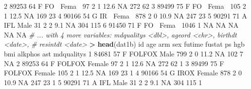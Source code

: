 \documentclass[
]{book}
\newenvironment{Shaded}{\begin{snugshade}}{\end{snugshade}}
\newcommand{\CommentTok}[1]{\textcolor[rgb]{0.56,0.35,0.01}{\textit{#1}}}
\newcommand{\DecValTok}[1]{\textcolor[rgb]{0.00,0.00,0.81}{#1}}
\newcommand{\FloatTok}[1]{\textcolor[rgb]{0.00,0.00,0.81}{#1}}
\newcommand{\KeywordTok}[1]{\textcolor[rgb]{0.13,0.29,0.53}{\textbf{#1}}}
\newcommand{\NormalTok}[1]{#1}
\newcommand{\OperatorTok}[1]{\textcolor[rgb]{0.81,0.36,0.00}{\textbf{#1}}}
\newcommand{\OtherTok}[1]{\textcolor[rgb]{0.56,0.35,0.01}{#1}}
\newcommand{\StringTok}[1]{\textcolor[rgb]{0.31,0.60,0.02}{#1}}
\begin{document}
\begin{Shaded}
\begin{Highlighting}[]
\DecValTok{2} \DecValTok{89253}    \DecValTok{64}\NormalTok{ F FO}\OperatorTok{~}\StringTok{ }\NormalTok{Fema}\OperatorTok{~}\StringTok{     }\DecValTok{97}      \DecValTok{2}     \DecValTok{1}  \FloatTok{12.6}    \OtherTok{NA}     \DecValTok{272}    \DecValTok{62}
\DecValTok{3} \DecValTok{89499}    \DecValTok{75}\NormalTok{ F FO}\OperatorTok{~}\StringTok{ }\NormalTok{Fema}\OperatorTok{~}\StringTok{    }\DecValTok{105}      \DecValTok{2}     \DecValTok{1}  \FloatTok{12.5}    \OtherTok{NA}     \DecValTok{169}    \DecValTok{23}
\DecValTok{4} \DecValTok{90166}    \DecValTok{54}\NormalTok{ G IR}\OperatorTok{~}\StringTok{ }\NormalTok{Fema}\OperatorTok{~}\StringTok{    }\DecValTok{878}      \DecValTok{2}     \DecValTok{0}  \FloatTok{10.9}    \OtherTok{NA}     \DecValTok{247}    \DecValTok{23}
\DecValTok{5} \DecValTok{90291}    \DecValTok{71}\NormalTok{ A IFL Male      }\DecValTok{31}      \DecValTok{2}     \DecValTok{2}   \FloatTok{9.1}    \OtherTok{NA}     \DecValTok{304}   \DecValTok{115}
\DecValTok{6} \DecValTok{91450}    \DecValTok{71}\NormalTok{ F FO}\OperatorTok{~}\StringTok{ }\NormalTok{Fema}\OperatorTok{~}\StringTok{   }\DecValTok{1046}      \DecValTok{1}    \OtherTok{NA}  \OtherTok{NA}      \OtherTok{NA}      \OtherTok{NA}    \OtherTok{NA}
\CommentTok{# ... with 4 more variables: mdqualitys <dbl>, ageord <chr>, birthdt <date>,}
\CommentTok{#   resintdt <date>}
\OperatorTok{>}\StringTok{ }\KeywordTok{head}\NormalTok{(dat1b)}
\NormalTok{     id age      arm    sex futime fustat ps  hgb bmi alkphos ast mdqualitys}
\DecValTok{1} \DecValTok{84681}  \DecValTok{57}\NormalTok{ F FOLFOX   Male    }\DecValTok{799}      \DecValTok{2}  \DecValTok{0} \FloatTok{11.2}  \OtherTok{NA}     \DecValTok{102}   \DecValTok{7}         \OtherTok{NA}
\DecValTok{2} \DecValTok{89253}  \DecValTok{64}\NormalTok{ F FOLFOX Female     }\DecValTok{97}      \DecValTok{2}  \DecValTok{1} \FloatTok{12.6}  \OtherTok{NA}     \DecValTok{272}  \DecValTok{62}          \DecValTok{1}
\DecValTok{3} \DecValTok{89499}  \DecValTok{75}\NormalTok{ F FOLFOX Female    }\DecValTok{105}      \DecValTok{2}  \DecValTok{1} \FloatTok{12.5}  \OtherTok{NA}     \DecValTok{169}  \DecValTok{23}          \DecValTok{1}
\DecValTok{4} \DecValTok{90166}  \DecValTok{54}\NormalTok{   G IROX Female    }\DecValTok{878}      \DecValTok{2}  \DecValTok{0} \FloatTok{10.9}  \OtherTok{NA}     \DecValTok{247}  \DecValTok{23}          \DecValTok{1}
\DecValTok{5} \DecValTok{90291}  \DecValTok{71}\NormalTok{    A IFL   Male     }\DecValTok{31}      \DecValTok{2}  \DecValTok{2}  \FloatTok{9.1}  \OtherTok{NA}     \DecValTok{304} \DecValTok{115}          \DecValTok{1}

\end{Highlighting}
\end{Shaded}
\end{document}
